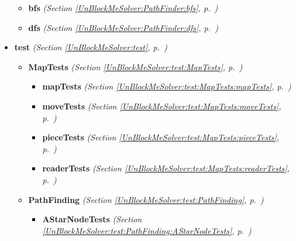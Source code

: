 \begin{itemize}
\begin{itemize}
    \item \textbf{bfs}
  \textit{(Section \ref{UnBlockMeSolver:PathFinder:bfs}, p.~\pageref{UnBlockMeSolver:PathFinder:bfs})}

    \item \textbf{dfs}
  \textit{(Section \ref{UnBlockMeSolver:PathFinder:dfs}, p.~\pageref{UnBlockMeSolver:PathFinder:dfs})}

  \end{itemize}
\item \textbf{test}
  \textit{(Section \ref{UnBlockMeSolver:test}, p.~\pageref{UnBlockMeSolver:test})}

  \begin{itemize}
\setlength{\parskip}{0ex}
    \item \textbf{MapTests}
  \textit{(Section \ref{UnBlockMeSolver:test:MapTests}, p.~\pageref{UnBlockMeSolver:test:MapTests})}

      \begin{itemize}
    \setlength{\parskip}{0ex}
        \item \textbf{mapTests}
  \textit{(Section \ref{UnBlockMeSolver:test:MapTests:mapTests}, p.~\pageref{UnBlockMeSolver:test:MapTests:mapTests})}

        \item \textbf{moveTests}
  \textit{(Section \ref{UnBlockMeSolver:test:MapTests:moveTests}, p.~\pageref{UnBlockMeSolver:test:MapTests:moveTests})}

        \item \textbf{pieceTests}
  \textit{(Section \ref{UnBlockMeSolver:test:MapTests:pieceTests}, p.~\pageref{UnBlockMeSolver:test:MapTests:pieceTests})}

        \item \textbf{readerTests}
  \textit{(Section \ref{UnBlockMeSolver:test:MapTests:readerTests}, p.~\pageref{UnBlockMeSolver:test:MapTests:readerTests})}

      \end{itemize}
    \item \textbf{PathFinding}
  \textit{(Section \ref{UnBlockMeSolver:test:PathFinding}, p.~\pageref{UnBlockMeSolver:test:PathFinding})}

      \begin{itemize}
    \setlength{\parskip}{0ex}
        \item \textbf{AStarNodeTests}
  \textit{(Section \ref{UnBlockMeSolver:test:PathFinding:AStarNodeTests}, p.~\pageref{UnBlockMeSolver:test:PathFinding:AStarNodeTests})}


\end{itemize}
\end{itemize}
\end{itemize}
